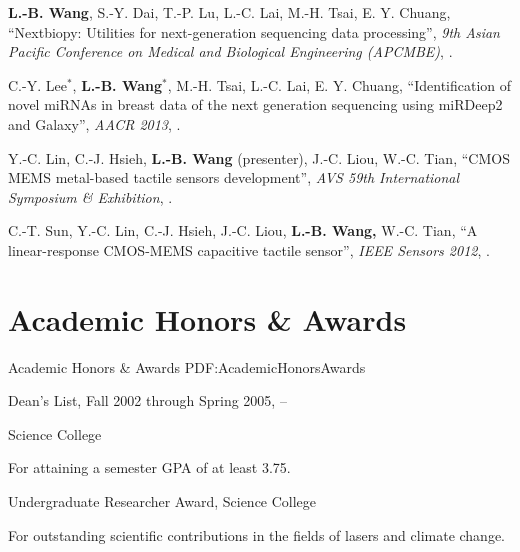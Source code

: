 \documentclass[a4paper,10pt,oneside]{article}
\begin{document}
\begin{body}
\begin{publication}[widest*=100]
    \item
        \textbf{L.-B. Wang}, S.-Y. Dai, T.-P. Lu, L.-C. Lai, M.-H. Tsai, E. Y. Chuang,
        ``Nextbiopy: Utilities for next-generation sequencing data processing'',
        \textit{9th Asian Pacific Conference on Medical and Biological Engineering (APCMBE)},
        .

    \item
        C.-Y. Lee$^*$, \textbf{L.-B. Wang}$^*$, M.-H. Tsai, L.-C. Lai, E. Y. Chuang,
        ``Identification of novel miRNAs in breast data of the next generation sequencing using miRDeep2 and Galaxy'',
        \textit{AACR 2013},
        .

    \item
        Y.-C. Lin, C.-J. Hsieh, \textbf{L.-B. Wang} (presenter), J.-C. Liou, W.-C. Tian,
        ``CMOS MEMS metal-based tactile sensors development'',
        \textit{AVS 59th International Symposium \& Exhibition},
        .

    \item
        C.-T. Sun, Y.-C. Lin, C.-J. Hsieh, J.-C. Liou, \textbf{L.-B. Wang,} W.-C. Tian,
        ``A linear-response CMOS-MEMS capacitive tactile sensor'',
        \textit{IEEE Sensors 2012},
        .

\end{publication}


\section
{Academic Honors\newline
\& Awards}
{Academic Honors \& Awards}
{PDF:AcademicHonorsAwards}

Dean's List,
Fall 2002 through Spring 2005,
\hfill
{} --
\par
Science College
\begin{detail}
For attaining a semester GPA of at least 3.75.
\end{detail}

\EntryGap
Undergraduate Researcher Award,
Science College
\hfill
{}
\begin{detail}
For outstanding scientific contributions in the fields of lasers and climate change.
\end{detail}


\end{body}
\end{document}
